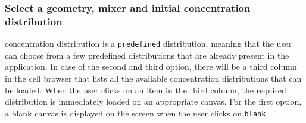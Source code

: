 \subsubsection{Select a geometry, mixer and initial concentration distribution}
concentration distribution is a \texttt{predefined} distribution, meaning that the user can choose from a few predefined distributions that are already present in the application. In case of the second and third option, there will be a third column in the cell browser that lists all the available concentration distributions that can be loaded. When the user clicks on an item in the third column, the required distribution is immediately loaded on an appropriate canvas. For the first option, a blank canvas is displayed on the screen when the user clicks on \texttt{blank}. \\

